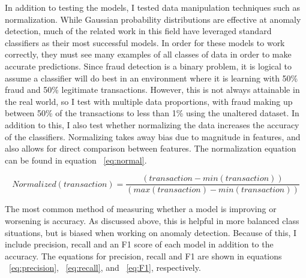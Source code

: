 \documentclass[midd]{thesis}
\begin{document}

In addition to testing the models, I tested data manipulation techniques such as normalization. While Gaussian probability distributions are effective at anomaly detection, much of the related work in this field have leveraged standard classifiers as their most successful models. In order for these models to work correctly, they must see many examples of all classes of data in order to make accurate predictions. Since fraud detection is a binary problem, it is logical to assume a classifier will do best in an environment where it is learning with 50\% fraud and 50\% legitimate transactions. However, this is not always attainable in the real world, so I test with multiple data proportions, with fraud making up between 50\% of the transactions to less than 1\% using the unaltered dataset. In addition to this, I also test whether normalizing the data increases the accuracy of the classifiers. Normalizing takes away bias due to magnitude in features, and also allows for direct comparison between features. The normalization equation can be found in equation ~\ref{eq:normal}. 


\begin{equation}
\label{eq:normal}
Normalized(transaction) = \frac{( transaction - min(transaction))}{  (max(transaction) - min(transaction))}
\end{equation}

The most common method of measuring whether a model is improving or worsening is accuracy. As discussed above, this is helpful in more balanced class situations, but is biased when working on anomaly detection. Because of this, I include precision, recall and an F1 score of each model in addition to the accuracy. The equations for precision, recall and F1 are shown in equations ~\ref{eq:precision}, ~\ref{eq:recall}, and ~\ref{eq:F1}, respectively. 
\end{document}

